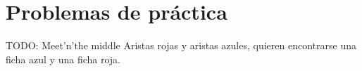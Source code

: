 \section{Problemas de práctica}
\begin{exercise}
\end{exercise}

\begin{exercise}
	TODO: Meet'n'the middle Aristas rojas y aristas azules, quieren encontrarse una ficha azul y una ficha roja.
\end{exercise}

\begin{exercise}
	
\end{exercise}


